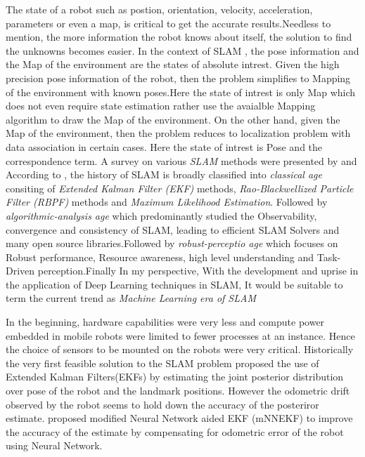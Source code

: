     The state of a robot such as postion, orientation, velocity, acceleration, parameters or even a map, is critical to get the accurate results.Needless to mention, the more information the robot
    knows about itself, the solution to find the unknowns becomes easier. In the context of SLAM , the pose information and the Map of the environment are the states of absolute intrest. Given the
    high precision pose information of the robot, then the problem simplifies to Mapping of the environment with known poses.Here the state of intrest is only Map which does not even require state 
    estimation rather use the avaialble Mapping algorithm to draw the Map of the environment. On the other hand, given the Map of the environment, then the problem reduces to localization problem 
    with data association in certain cases. Here the state of intrest is Pose and the correspondence term. A survey on various \textit{SLAM} methods were presented by \cite{C.Cadena} and \cite{T.Takleh}
    According to \cite{C.Cadena}, the history of SLAM is broadly classified into \textit{classical age} consiting of \textit{Extended Kalman Filter (EKF)} methods, \textit{Rao-Blackwellized Particle Filter (RBPF)} methods
    and \textit{Maximum Likelihood Estimation}. Followed by \textit{algorithmic-analysis age} which predominantly studied the Observability, convergence and consistency of SLAM, leading to efficient SLAM Solvers and
    many open source libraries.Followed by \textit{robust-perceptio age} which focuses on Robust performance, Resource awareness, high level understanding and Task-Driven perception.Finally In my 
    perspective, With the development and uprise in the application of Deep Learning techniques in SLAM, It would be suitable to term the current trend as \textit{Machine Learning era of SLAM}

    In the beginning, hardware capabilities were very less and compute power embedded in mobile robots were limited to fewer processes at an instance. Hence the choice of sensors to be mounted on 
    the robots were very critical. Historically the very first feasible solution to the SLAM problem proposed the use of Extended Kalman Filters(EKFs) by estimating the joint posterior distribution 
    over pose of the robot and the landmark positions. However the odometric drift observed by the robot seems to hold down the accuracy of the posteriror estimate.\cite{J.Kang} proposed  modified 
    Neural Network aided EKF (mNNEKF) to improve the accuracy of the estimate by compensating for odometric error of the robot using Neural Network.

